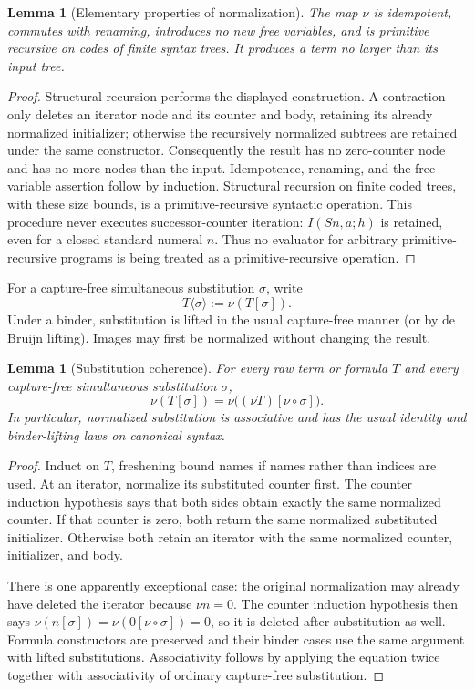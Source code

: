 \documentclass[11pt,a4paper]{article}
\newtheorem{lemma}[theorem]{Lemma}
\theoremstyle{definition}
\begin{document}
\begin{lemma}[Elementary properties of normalization]
The map $\nu$ is idempotent, commutes with renaming, introduces no new free
variables, and is primitive recursive on codes of finite syntax trees.
It produces a term no larger than its input tree.
\end{lemma}
\begin{proof}
Structural recursion performs the displayed construction.  A contraction
only deletes an iterator node and its counter and body, retaining its
already normalized initializer; otherwise the recursively normalized
subtrees are retained under the same constructor.  Consequently the
result has no zero-counter node and has no more nodes than the input.
Idempotence, renaming, and the free-variable assertion follow by induction.
Structural recursion on finite coded trees, with these size bounds, is a
primitive-recursive syntactic operation.  This procedure never executes
successor-counter iteration: $I(Sn,a;h)$ is retained, even for a closed
standard numeral $n$.  Thus no evaluator for arbitrary primitive-recursive
programs is being treated as a primitive-recursive operation.
\end{proof}

For a capture-free simultaneous substitution $\sigma$, write
\[
 T\langle\sigma\rangle:=\nu(T[\sigma]).
\]
Under a binder, substitution is lifted in the usual capture-free manner
(or by de Bruijn lifting).  Images may first be normalized without changing
the result.

\begin{lemma}[Substitution coherence]\label{zeroI:coherence}
For every raw term or formula $T$ and every capture-free simultaneous
substitution $\sigma$,
\[
 \nu(T[\sigma])=
 \nu\bigl((\nu T)[\nu\circ\sigma]\bigr).
\]
In particular, normalized substitution is associative and has the usual
identity and binder-lifting laws on canonical syntax.
\end{lemma}
\begin{proof}
Induct on $T$, freshening bound names if names rather than indices are
used.  At an iterator, normalize its substituted counter first.  The
counter induction hypothesis says that both sides obtain exactly the
same normalized counter.  If that counter is zero, both return the
same normalized substituted initializer.  Otherwise both retain an
iterator with the same normalized counter, initializer, and body.

There is one apparently exceptional case: the original normalization
may already have deleted the iterator because $\nu n=0$.  The counter
induction hypothesis then says
$\nu(n[\sigma])=\nu(0[\nu\circ\sigma])=0$, so it is deleted after
substitution as well.  Formula constructors are preserved and their
binder cases use the same argument with lifted substitutions.
Associativity follows by applying the equation twice together with
associativity of ordinary capture-free substitution.
\end{proof}
\end{document}
